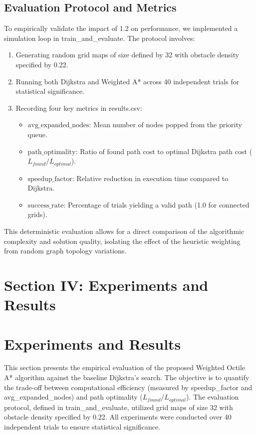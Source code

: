 \documentclass[conference]{IEEEtran}
\renewcommand{\texttt}[1]{{\normalfont\ttfamily #1}}
\begin{document}
\subsection{Evaluation Protocol and Metrics}
To empirically validate the impact of 1.2 on performance, we implemented a simulation loop in train\_and\_evaluate. The protocol involves:
\begin{enumerate}
    \item Generating random grid maps of size defined by 32 with obstacle density specified by 0.22.
    \item Running both Dijkstra and Weighted A* across 40 independent trials for statistical significance.
    \item Recording four key metrics in \texttt{results.csv}:
    \begin{itemize}
        \item $\text{avg\_expanded\_nodes}$: Mean number of nodes popped from the priority queue.
        \item $\text{path\_optimality}$: Ratio of found path cost to optimal Dijkstra path cost ($L_{found} / L_{optimal}$).
        \item $\text{speedup\_factor}$: Relative reduction in execution time compared to Dijkstra.
        \item $\text{success\_rate}$: Percentage of trials yielding a valid path (1.0 for connected grids).
    \end{itemize}
\end{enumerate}

This deterministic evaluation allows for a direct comparison of the algorithmic complexity and solution quality, isolating the effect of the heuristic weighting from random graph topology variations.

\section{Section IV: Experiments and Results}
\section{Experiments and Results}\label{sec:experiments}

This section presents the empirical evaluation of the proposed Weighted Octile A* algorithm against the baseline Dijkstra's search. The objective is to quantify the trade-off between computational efficiency (measured by \texttt{speedup\_factor} and \texttt{avg\_expanded\_nodes}) and path optimality ($L_{found}/L_{optimal}$). The evaluation protocol, defined in train\_and\_evaluate, utilized grid maps of size 32 with obstacle density specified by 0.22. All experiments were conducted over 40 independent trials to ensure statistical significance.
\end{document}
